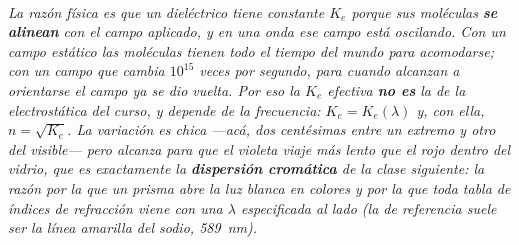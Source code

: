\begin{center}
\\[0.5em]
{\small\itshape La razón física es que un dieléctrico tiene constante $K_e$
porque sus moléculas \textbf{se alinean} con el campo aplicado, y en una onda ese
campo está oscilando. Con un campo estático las moléculas tienen todo el tiempo
del mundo para acomodarse; con un campo que cambia $10^{15}$ veces por segundo,
para cuando alcanzan a orientarse el campo ya se dio vuelta. Por eso la $K_e$
efectiva \textbf{no es} la de la electrostática del curso, y depende de la
frecuencia: $K_e = K_e(\lambda)$ y, con ella, $n = \sqrt{K_e}$. La variación es
chica ---acá, dos centésimas entre un extremo y otro del visible--- pero alcanza
para que el violeta viaje más lento que el rojo dentro del vidrio, que es
exactamente la \textbf{dispersión cromática} de la clase siguiente: la razón por
la que un prisma abre la luz blanca en colores y por la que toda tabla de índices
de refracción viene con una $\lambda$ especificada al lado (la de referencia
suele ser la línea amarilla del sodio, \SI{589}{\nano\metre}).}
\end{center}
